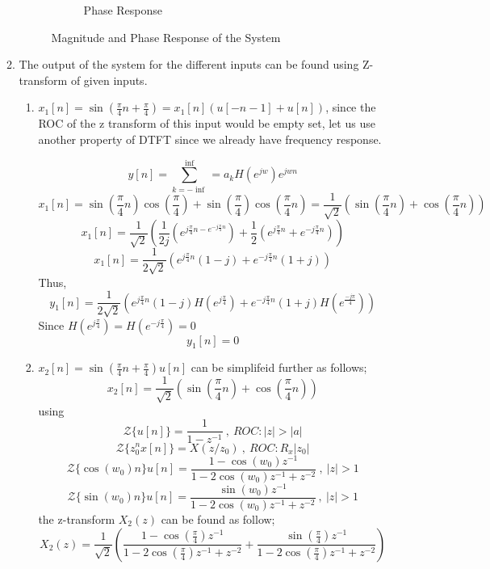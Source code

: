 \documentclass[a4paper,12pt]{article}
\begin{document}
\begin{enumerate}
\begin{enumerate}
\begin{figure}[H]
\begin{subfigure}{.5\textwidth}
  					\caption{\label{fig:q1b2}Phase Response}
				\end{subfigure}
			\caption{\label{fig:Q1b} Magnitude and Phase Response of the System   }
			\end{figure}

 			\item The output of the system for the different inputs can be found using Z-transform of given inputs.
 				\begin{enumerate}
 					\item $	x_1[n]=\sin(\frac{\pi}{4}n+\frac{\pi}{4})=x_1[n]\left(u[-n-1]+u[n]\right)$, since the ROC of the z transform of this input would be empty set, let us use another property of DTFT since we already have frequency response.
 					
 					$$ y[n]=\sum_{k=-\inf}^{\inf}=a_kH(e^{jw})e^{jwn} $$
 					$$	x_1[n]=\sin(\frac{\pi}{4}n)\cos(\frac{\pi}{4})+\sin(\frac{\pi}{4})\cos(\frac{\pi}{4}n)=\frac{1}{\sqrt{2}}\left( \sin(\frac{\pi}{4}n)+\cos(\frac{\pi}{4}n) \right) $$
 					$$	x_1[n]=\frac{1}{\sqrt{2}} \left( \frac{1}{2j}(e^{j\frac{\pi}{4}n-e^{-j\frac{\pi}{4}n}})+\frac{1}{2}(e^{j\frac{\pi}{4}n}+e^{-j\frac{\pi}{4}n}) \right)$$
 					$$	x_1[n]=\frac{1}{2\sqrt{2}}\left( e^{j\frac{\pi}{4}n}(1-j)+  e^{-j\frac{\pi}{4}n}(1+j)	\right)$$
 					Thus,
 					$$ y_1[n]=\frac{1}{2\sqrt{2}}\left( e^{j\frac{\pi}{4}n}(1-j)H(e^{j\frac{\pi}{4}})+  e^{-j\frac{\pi}{4}n}(1+j)H(e^{\frac{-j\pi}{4}})	\right)$$
					Since  $H(e^{j\frac{\pi}{4}})=H(e^{-j\frac{\pi}{4}})=0$
					$$\boxed{ y_1[n]=0 }$$					
 					\item  $x_2[n]=\sin(\frac{\pi}{4}n+\frac{\pi}{4})u[n]$ can be simplifeid further as follows;
 						$$x_2[n]= \frac{1}{\sqrt{2}} \left( \sin(\frac{\pi}{4}n)+\cos(\frac{\pi}{4}n) \right) $$
	 					using 
	 					$$ \mathcal{Z} \{u[n]\} = \frac{1}{1-z^{-1}} \ , \ ROC:|z|>|a|	$$
						$$ \mathcal{Z} \{ z_0^nx[n] \}=X(z/z_0) \ , \ ROC:R_x|z_0|$$ 
						$$ \mathcal{Z} \{ \cos(w_0)n	\}u[n]=\frac{1-\cos(w_0)z^{-1}}{1-2\cos(w_0)z^{-1}+z^{-2}} \ , \ |z|>1$$
						$$ \mathcal{Z} \{ \sin(w_0)n	\}u[n]=\frac{\sin(w_0)z^{-1}}{1-2\cos(w_0)z^{-1}+z^{-2}} \ , \ |z|>1 $$		
 						the z-transform $X_2(z)$ can be found as follow;
 						$$ X_2(z)= \frac{1}{\sqrt{2}} \left( \frac{1-\cos(\frac{\pi}{4})z^{-1}}{1-2\cos(\frac{\pi}{4})z^{-1}+z^{-2}}+ \frac{\sin(\frac{\pi}{4})z^{-1}}{1-2\cos(\frac{\pi}{4})z^{-1}+z^{-2}}\right)$$

\end{enumerate}
\end{enumerate}
\end{enumerate}
\end{document}
